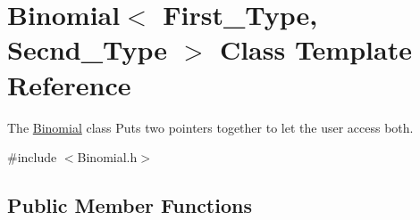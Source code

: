 \hypertarget{class_binomial}{}\section{Binomial$<$ First\+\_\+\+Type, Secnd\+\_\+\+Type $>$ Class Template Reference}
\label{class_binomial}


The \hyperlink{class_binomial}{Binomial} class Puts two pointers together to let the user access both.  




{\ttfamily \#include $<$Binomial.\+h$>$}

\subsection*{Public Member Functions}
